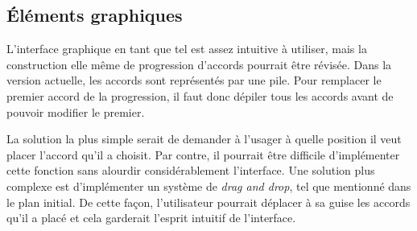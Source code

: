 \documentclass[letterpaper,12pt]{scrartcl}
\begin{document}
		\subsection{Éléments graphiques}
		L'interface graphique en tant que tel est assez intuitive à utiliser, mais la construction elle même de progression d'accords pourrait être révisée. Dans la version actuelle, les accords sont représentés par une pile. Pour remplacer le premier accord de la progression, il faut donc dépiler tous les accords avant de pouvoir modifier le premier.
		
		 La solution la plus simple serait de demander à l'usager à quelle position il veut placer l'accord qu'il a choisit. Par contre, il pourrait être difficile d'implémenter cette fonction sans alourdir considérablement l'interface. Une solution plus complexe est d'implémenter un système de \textit{drag and drop}, tel que mentionné dans le plan initial. De cette façon, l'utilisateur pourrait déplacer à sa guise les accords qu'il a placé et cela garderait l'esprit intuitif de l'interface.
\end{document}
